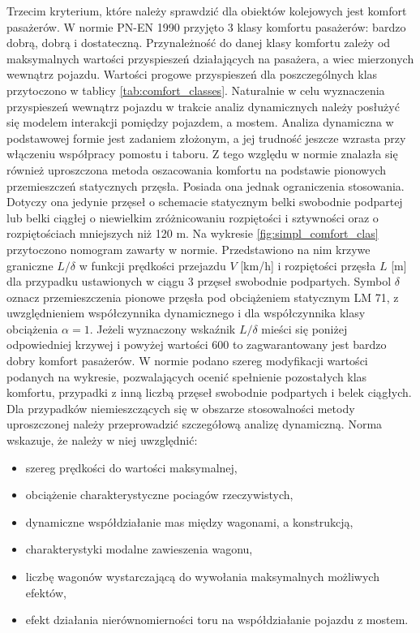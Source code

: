 Trzecim kryterium, które należy sprawdzić dla obiektów kolejowych jest komfort pasażerów. W normie PN-EN 1990 przyjęto 3 klasy komfortu pasażerów: bardzo dobrą, dobrą i dostateczną. Przynależność do danej klasy komfortu zależy od maksymalnych wartości przyspieszeń działających na pasażera, a wiec mierzonych wewnątrz pojazdu. Wartości progowe przyspieszeń dla poszczególnych klas przytoczono w tablicy \ref{tab:comfort_classes}. Naturalnie w celu wyznaczenia przyspieszeń wewnątrz pojazdu w trakcie analiz dynamicznych należy posłużyć się modelem interakcji pomiędzy pojazdem, a mostem. Analiza dynamiczna w podstawowej formie jest zadaniem złożonym, a jej trudność jeszcze wzrasta przy włączeniu współpracy pomostu i taboru. Z tego względu w normie znalazła się również uproszczona metoda oszacowania komfortu na podstawie pionowych przemieszczeń statycznych przęsła. Posiada ona jednak ograniczenia stosowania. Dotyczy ona jedynie przęseł o schemacie statycznym belki swobodnie podpartej lub belki ciągłej o niewielkim zróżnicowaniu rozpiętości i sztywności oraz o rozpiętościach mniejszych niż 120 m. Na wykresie \ref{fig:simpl_comfort_clas} przytoczono nomogram zawarty w normie. Przedstawiono na nim krzywe graniczne $L/\delta$ w funkcji prędkości przejazdu $V $ [km/h] i rozpiętości przęsła $L$ [m] dla przypadku ustawionych w ciągu 3 przęseł swobodnie podpartych. Symbol $\delta$ oznacz przemieszczenia pionowe przęsła pod obciążeniem statycznym LM 71, z uwzględnieniem współczynnika dynamicznego i dla współczynnika klasy obciążenia $\alpha =1$. Jeżeli wyznaczony wskaźnik $L/\delta$ mieści się poniżej odpowiedniej krzywej i powyżej wartości 600 to zagwarantowany jest bardzo dobry komfort pasażerów. W normie podano szereg modyfikacji wartości podanych na wykresie, pozwalających ocenić spełnienie pozostałych klas komfortu, przypadki z inną liczbą przęseł swobodnie podpartych i belek ciągłych.
Dla przypadków niemieszczących się w obszarze stosowalności metody uproszczonej należy przeprowadzić szczegółową analizę dynamiczną. Norma wskazuje, że należy w niej uwzględnić:
\begin{itemize}[noitemsep]
	\item szereg prędkości do wartości maksymalnej,
	\item obciążenie charakterystyczne pociagów rzeczywistych,
	\item dynamiczne współdziałanie mas między wagonami, a konstrukcją,
	\item charakterystyki modalne zawieszenia wagonu,
	\item liczbę wagonów wystarczającą do wywołania maksymalnych możliwych efektów,
	\item efekt działania nierównomierności toru na współdziałanie pojazdu z mostem.
\end{itemize}

